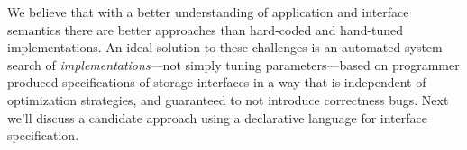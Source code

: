 We believe that with a better understanding of application and interface
semantics there are better approaches than hard-coded and hand-tuned
implementations.  An ideal solution to these challenges is an automated system
search of \emph{implementations}---not simply tuning parameters---based on
programmer produced specifications of storage interfaces in a way that is
independent of optimization strategies, and guaranteed to not introduce
correctness bugs. Next we'll discuss a candidate approach using a declarative
language for interface specification.
